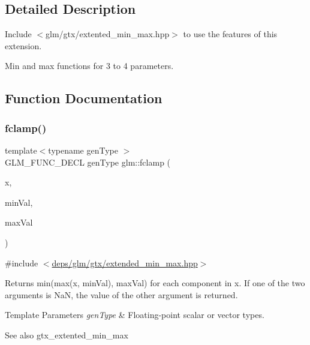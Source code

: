 \subsection{Detailed Description}
Include $<$glm/gtx/extented\+\_\+min\+\_\+max.\+hpp$>$ to use the features of this extension.

Min and max functions for 3 to 4 parameters. 

\subsection{Function Documentation}
\mbox{\label{group__gtx__extended__min__max_ga1e28539d3a46965ed9ef92ec7cb3b18a}} 
\subsubsection{\texorpdfstring{fclamp()}{fclamp()}\hspace{0.1cm}{\footnotesize\ttfamily [1/3]}}
{\footnotesize\ttfamily template$<$typename gen\+Type $>$ \\
G\+L\+M\+\_\+\+F\+U\+N\+C\+\_\+\+D\+E\+CL gen\+Type glm\+::fclamp (\begin{DoxyParamCaption}\item[{gen\+Type}]{x,  }\item[{gen\+Type}]{min\+Val,  }\item[{gen\+Type}]{max\+Val }\end{DoxyParamCaption})}



{\ttfamily \#include $<$\hyperlink{extended__min__max_8hpp}{deps/glm/gtx/extended\+\_\+min\+\_\+max.\+hpp}$>$}

Returns min(max(x, min\+Val), max\+Val) for each component in x. If one of the two arguments is NaN, the value of the other argument is returned.


\begin{DoxyTemplParams}{Template Parameters}
{\em gen\+Type} & Floating-\/point scalar or vector types.\\
\hline
\end{DoxyTemplParams}
\begin{DoxySeeAlso}{See also}
gtx\+\_\+extented\+\_\+min\+\_\+max 
\end{DoxySeeAlso}


